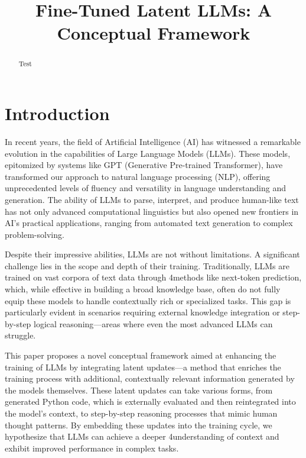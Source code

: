 \documentclass[
]{article}
\title{Fine-Tuned Latent LLMs: A Conceptual Framework}
\author{}
\date{\vspace{-2.5em}}
\begin{document}
\maketitle
\begin{abstract}
Test
\end{abstract}

{
\setcounter{tocdepth}{2}
\tableofcontents
}
\hypertarget{introduction}{%
\section{Introduction}\label{introduction}}

In recent years, the field of Artificial Intelligence (AI) has witnessed
a remarkable evolution in the capabilities of Large Language Models
(LLMs). These models, epitomized by systems like GPT (Generative
Pre-trained Transformer), have transformed our approach to natural
language processing (NLP), offering unprecedented levels of fluency and
versatility in language understanding and generation. The ability of
LLMs to parse, interpret, and produce human-like text has not only
advanced computational linguistics but also opened new frontiers in AI's
practical applications, ranging from automated text generation to
complex problem-solving.

Despite their impressive abilities, LLMs are not without limitations. A
significant challenge lies in the scope and depth of their training.
Traditionally, LLMs are trained on vast corpora of text data through
4methods like next-token prediction, which, while effective in building
a broad knowledge base, often do not fully equip these models to handle
contextually rich or specialized tasks. This gap is particularly evident
in scenarios requiring external knowledge integration or step-by-step
logical reasoning---areas where even the most advanced LLMs can
struggle.

This paper proposes a novel conceptual framework aimed at enhancing the
training of LLMs by integrating latent updates---a method that enriches
the training process with additional, contextually relevant information
generated by the models themselves. These latent updates can take
various forms, from generated Python code, which is externally evaluated
and then reintegrated into the model's context, to step-by-step
reasoning processes that mimic human thought patterns. By embedding
these updates into the training cycle, we hypothesize that LLMs can
achieve a deeper 4understanding of context and exhibit improved
performance in complex tasks.
\end{document}

